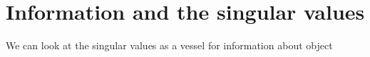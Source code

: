 \chapter{Information and the singular values}
We can look at the singular values as a vessel for information about object




\endinput